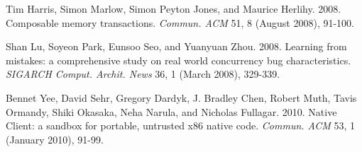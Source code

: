 \documentclass{sigplanconf}
\begin{document}
\begin{thebibliography}{}
 Tim Harris, Simon Marlow, Simon Peyton Jones, and
  Maurice Herlihy. 2008. Composable memory transactions.
  \emph{Commun. ACM} 51, 8 (August 2008), 91-100.


  Shan Lu, Soyeon Park, Eunsoo Seo, and Yuanyuan Zhou. 2008. Learning
  from mistakes: a comprehensive study on real world concurrency bug
  characteristics. \emph{SIGARCH Comput. Archit. News} 36, 1 (March 2008),
  329-339.

  Bennet Yee, David Sehr, Gregory Dardyk, J. Bradley Chen, Robert
  Muth, Tavis Ormandy, Shiki Okasaka, Neha Narula, and Nicholas
  Fullagar. 2010. Native Client: a sandbox for portable, untrusted x86
  native code. \emph{Commun. ACM} 53, 1 (January 2010), 91-99.



\end{thebibliography}
\end{document}
